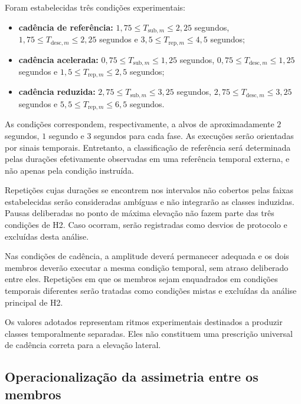 Foram estabelecidas três condições experimentais:

\begin{itemize}
    \item \textbf{cadência de referência:}
    $1{,}75 \leq T_{\mathrm{sub},m} \leq 2{,}25$ segundos,
    $1{,}75 \leq T_{\mathrm{desc},m} \leq 2{,}25$ segundos e
    $3{,}5 \leq T_{\mathrm{rep},m} \leq 4{,}5$ segundos;

    \item \textbf{cadência acelerada:}
    $0{,}75 \leq T_{\mathrm{sub},m} \leq 1{,}25$ segundos,
    $0{,}75 \leq T_{\mathrm{desc},m} \leq 1{,}25$ segundos e
    $1{,}5 \leq T_{\mathrm{rep},m} \leq 2{,}5$ segundos;

    \item \textbf{cadência reduzida:}
    $2{,}75 \leq T_{\mathrm{sub},m} \leq 3{,}25$ segundos,
    $2{,}75 \leq T_{\mathrm{desc},m} \leq 3{,}25$ segundos e
    $5{,}5 \leq T_{\mathrm{rep},m} \leq 6{,}5$ segundos.
\end{itemize}

As condições correspondem, respectivamente, a alvos de aproximadamente
$2$ segundos, $1$ segundo e $3$ segundos para cada fase. As execuções
serão orientadas por sinais temporais. Entretanto, a classificação de
referência será determinada pelas durações efetivamente observadas em
uma referência temporal externa, e não apenas pela condição instruída.

Repetições cujas durações se encontrem nos intervalos não cobertos pelas
faixas estabelecidas serão consideradas ambíguas e não integrarão as
classes induzidas. Pausas deliberadas no ponto de máxima elevação não
fazem parte das três condições de H2. Caso ocorram, serão registradas
como desvios de protocolo e excluídas desta análise.

Nas condições de cadência, a amplitude deverá permanecer adequada e os
dois membros deverão executar a mesma condição temporal, sem atraso
deliberado entre eles. Repetições em que os membros sejam enquadrados em
condições temporais diferentes serão tratadas como condições mistas e
excluídas da análise principal de H2.

Os valores adotados representam ritmos experimentais destinados a
produzir classes temporalmente separadas. Eles não constituem uma
prescrição universal de cadência correta para a elevação lateral.

\subsection{Operacionalização da assimetria entre os membros}
\label{subsec:operacionalizacao-assimetria}

